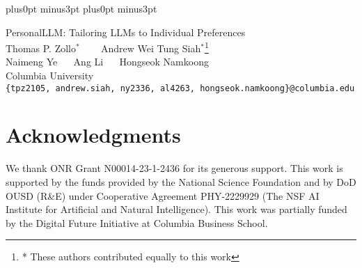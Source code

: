 \documentclass[11pt]{article}
\begin{document}
\abovedisplayskip=8pt plus0pt minus3pt
\belowdisplayskip=8pt plus0pt minus3pt



\begin{center}
  {\huge PersonalLLM: Tailoring LLMs to Individual Preferences } \\
  \vspace{.5cm} {\Large Thomas P. Zollo$^*$ ~~~ Andrew Wei Tung Siah$^*$}\footnote{* These authors contributed equally to this work}\\
  
  \vspace{.2cm}
  {\Large Naimeng Ye ~~ Ang Li ~~ Hongseok Namkoong} \\
  \vspace{.2cm}
  {\large Columbia University} \\
  \vspace{.2cm}
  \texttt{\{tpz2105, andrew.siah, ny2336, al4263, hongseok.namkoong\}@columbia.edu}
\end{center}











\newpage

\section*{Acknowledgments}\label{sec:acknowledgments}

We thank ONR Grant N00014-23-1-2436 for its generous support.  This work is supported by the funds provided by the National Science Foundation and by DoD OUSD (R\&E) under Cooperative Agreement PHY-2229929 (The NSF AI Institute for Artificial and Natural Intelligence). This work was partially funded by the Digital Future Initiative at Columbia Business School.


\newpage



\newpage
\begin{appendix}

\end{appendix}
\end{document}
